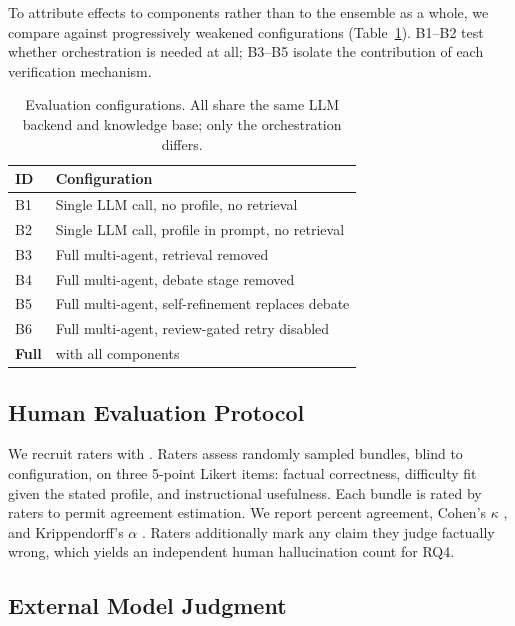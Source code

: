To attribute effects to components rather than to the ensemble as a whole, we
compare against progressively weakened configurations
(Table~\ref{tab:baselines}). B1--B2 test whether orchestration is needed at
all; B3--B5 isolate the contribution of each verification mechanism.

\begin{table}[!t]
\centering
\caption{Evaluation configurations. All share the same LLM backend and
knowledge base; only the orchestration differs.}
\label{tab:baselines}
\begin{tabular}{@{}ll@{}}
\toprule
\textbf{ID} & \textbf{Configuration} \\
\midrule
B1 & Single LLM call, no profile, no retrieval \\
B2 & Single LLM call, profile in prompt, no retrieval \\
B3 & Full multi-agent, retrieval removed \\
B4 & Full multi-agent, debate stage removed \\
B5 & Full multi-agent, self-refinement replaces debate \\
B6 & Full multi-agent, review-gated retry disabled \\
\midrule
\textbf{Full} & \sysname{} with all components \\
\bottomrule
\end{tabular}
\end{table}

\subsection{Human Evaluation Protocol}
\label{ssec:human}

We recruit  raters with . Raters assess  randomly sampled bundles, blind to
configuration, on three 5-point Likert items: factual correctness, difficulty
fit given the stated profile, and instructional usefulness. Each bundle is
rated by  raters to permit agreement estimation. We report
percent agreement, Cohen's $\kappa$ \cite{cohen1960kappa}, and
Krippendorff's $\alpha$ \cite{krippendorff2011computing}. Raters additionally
mark any claim they judge factually wrong, which yields an independent
human hallucination count for RQ4.

\subsection{External Model Judgment}

